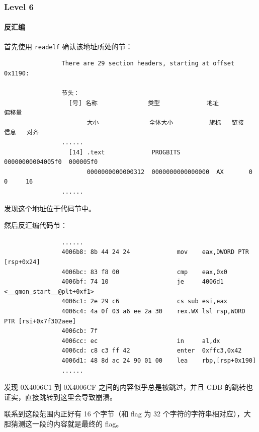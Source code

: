 \documentclass{ctexbeamer}
\begin{document}
    \begin{frame}[fragile]
        \frametitle{Level 6}
        \framesubtitle{反汇编}
    
        首先使用 \texttt{readelf} 确认该地址所处的节：

        {
            \scriptsize
            \begin{verbatim}
                There are 29 section headers, starting at offset 0x1190:

                节头：
                  [号] 名称              类型             地址              偏移量
                       大小              全体大小          旗标   链接   信息   对齐
                ......
                  [14] .text             PROGBITS         00000000004005f0  000005f0
                       0000000000000312  0000000000000000  AX       0     0     16         
                ......
            \end{verbatim}
        }

        发现这个地址位于代码节中。
    
    \end{frame}

    \begin{frame}[fragile]
    
        然后反汇编代码节：

        {
            \scriptsize
            \begin{verbatim}
                ......
                4006b8:	8b 44 24 24          	mov    eax,DWORD PTR [rsp+0x24]
                4006bc:	83 f8 00             	cmp    eax,0x0
                4006bf:	74 10                	je     4006d1 <__gmon_start__@plt+0xf1>
                4006c1:	2e 29 c6             	cs sub esi,eax
                4006c4:	4a 0f 03 a6 ee 2a 30 	rex.WX lsl rsp,WORD PTR [rsi+0x7f302aee]
                4006cb:	7f 
                4006cc:	ec                   	in     al,dx
                4006cd:	c8 c3 ff 42          	enter  0xffc3,0x42
                4006d1:	48 8d ac 24 90 01 00 	lea    rbp,[rsp+0x190]
                ......
            \end{verbatim}
        }

        发现 0X4006C1 到 0X4006CF 之间的内容似乎总是被跳过，并且 GDB 的跳转也证实，直接跳转到这里会导致崩溃。

        联系到这段范围内正好有 16 个字节（和 flag 为 32 个字符的字符串相对应），大胆猜测这一段的内容就是最终的 flag。
    
    \end{frame}
\end{document}
